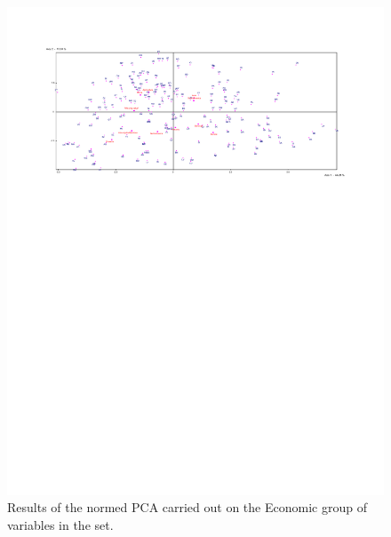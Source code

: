 \documentclass[a4paper,10pt,twocolumn]{article}
\begin{document}
\begin{figure}[!ht]
\begin{center}
\includegraphics[width=17cm]{p2b.pdf}
\caption{\footnotesize{Results of the normed PCA carried out on the Economic group of variables in the set.}\label{p2}}
\end{center}
\end{figure}
\end{document}
